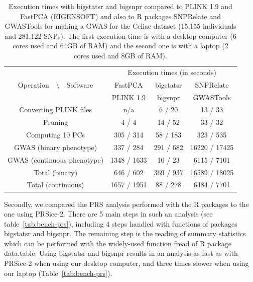 \documentclass{bioinfo}
\begin{document}
\begin{table}[!tpb]
\begin{center}
\begin{adjustbox}{max width=235pt}
\begin{tabular}{|c|c|c|c|}
\hline
\multirow{3}{*}{Operation~~\textbackslash~~Software} &   \multicolumn{3}{c|}{Execution times (in seconds)} \\
 \cline{2-4}
 & FastPCA & bigstatsr  & SNPRelate \\
 & PLINK 1.9 & bigsnpr & GWASTools \\
\hline
Converting PLINK files         &     n/a     &   6 /  20 &    13 /    33 \\
Pruning                     &    4 /    4 &  14 /  52 &    33 /    32 \\  
Computing 10 PCs            &  305 /  314 &  58 / 183 &   323 /   535 \\
GWAS (binary phenotype)     &  337 /  284 & 291 / 682 & 16220 / 17425 \\
GWAS (continuous phenotype) & 1348 / 1633 &  10 /  23 &  6115 /  7101 \\
\hline
Total (binary)              &  646 /  602 & 369 / 937 & 16589 / 18025 \\
Total (continuous)          & 1657 / 1951 &  88 / 278 &  6484 /  7701 \\
\hline
\end{tabular} 
\end{adjustbox}
\end{center}
\caption{Execution times with bigstatsr and bigsnpr compared to PLINK 1.9 and FastPCA (EIGENSOFT) and also to R packages SNPRelate and GWASTools for making a GWAS for the Celiac dataset (15,155 individuals and 281,122 SNPs). The first execution time is with a desktop computer (6 cores used and 64GB of RAM) and the second one is with a laptop (2 cores used and 8GB of RAM).} 
\label{tab:bench-gwas}
\end{table}

Secondly, we compared the PRS analysis performed with the R packages to the one using PRSice-2. There are 5 main steps in such an analysis (see table~\ref{tab:bench-prs}), including 4 steps handled with functions of packages bigstatsr and bigsnpr. The remaining step is the reading of summary statistics which can be performed with the widely-used function fread of R package data.table. Using bigstatsr and bigsnpr results in an analysis as fast as with PRSice-2 when using our desktop computer, and three times slower when using our laptop (Table~\ref{tab:bench-prs}).
\end{document}
